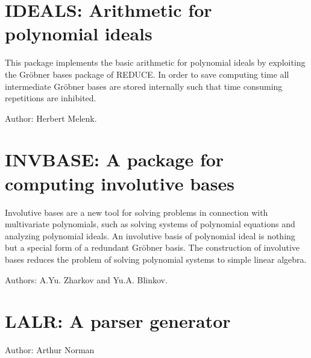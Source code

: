 \section{IDEALS: Arithmetic for polynomial ideals}

This package implements the basic arithmetic for polynomial ideals by
exploiting the Gr\"obner bases package of REDUCE.  In order to save
computing time all intermediate Gr\"obner bases are stored internally such
that time consuming repetitions are inhibited.

Author: Herbert Melenk.



\newpage

\iffalse
\section{INEQ: Support for solving inequalities}
\indexpackage{INEQ}

This package supports the operator \f{ineq\_solve} that
tries to solves single inequalities and sets of coupled inequalities.

Author: Herbert Melenk.



\newpage
\fi

\section{INVBASE: A package for computing involutive bases}

Involutive bases are a new tool for solving problems in connection with
multivariate polynomials, such as solving systems of polynomial equations
and analyzing polynomial ideals.  An involutive basis of polynomial ideal
is nothing but a special form of a redundant Gr\"obner basis.  The
construction of involutive bases reduces the problem of solving polynomial
systems to simple linear algebra.

Authors: A.Yu. Zharkov and Yu.A. Blinkov.



\newpage

\section{LALR: A parser generator}

Author: Arthur Norman



